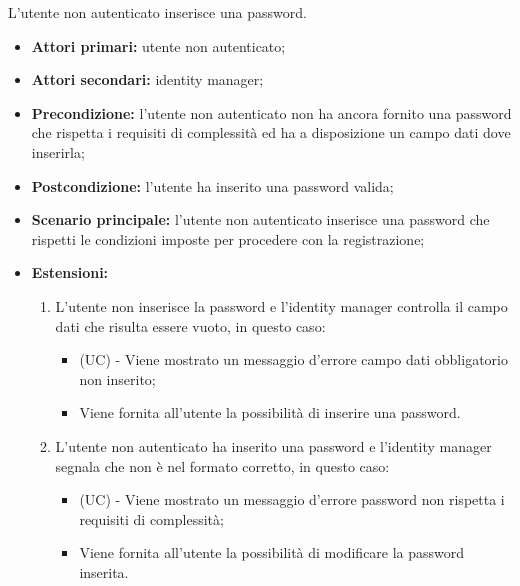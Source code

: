 L'utente non autenticato inserisce una password.
\begin{itemize}
	\item \textbf{Attori primari:} utente non autenticato;
	\item \textbf{Attori secondari:} identity manager;
	\item \textbf{Precondizione:} l'utente non autenticato non ha ancora fornito una password che rispetta i requisiti di complessità ed ha a disposizione un campo dati dove inserirla;
	\item \textbf{Postcondizione:} l'utente ha inserito una password valida;
	\item \textbf{Scenario principale:} l'utente non autenticato inserisce una password che rispetti le condizioni imposte per procedere con la registrazione;
	\item \textbf{Estensioni:}
	\begin{enumerate}[label=\lett]
		\item L'utente non inserisce la password e l'identity manager controlla il campo dati che risulta essere vuoto, in questo caso:
		\begin{itemize}
			\item (UC) - Viene mostrato un messaggio d'errore campo dati obbligatorio non inserito;
			\item Viene fornita all'utente la possibilità di inserire una password.
		\end{itemize}
		\item L'utente non autenticato ha inserito una password e l'identity manager segnala che non è nel formato corretto, in questo caso:
		\begin{itemize}
			\item (UC) - Viene mostrato un messaggio d'errore password non rispetta i requisiti di complessità;
			\item Viene fornita all'utente la possibilità di modificare la password inserita.
		\end{itemize}
	\end{enumerate} 
\end{itemize}

